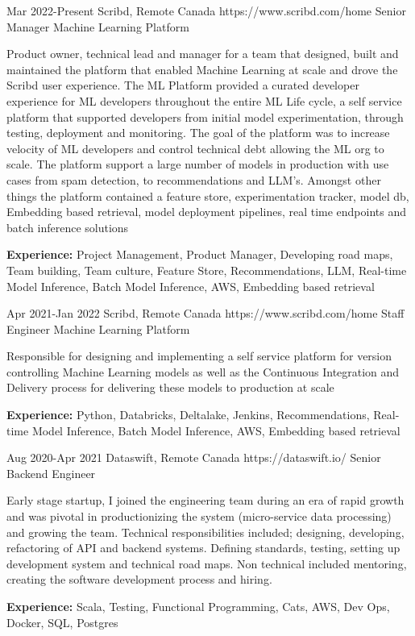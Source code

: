 \documentclass{article}
\begin{document}
\begin{job}
{Mar 2022-}{Present}
{Scribd, Remote Canada}
{https://www.scribd.com/home}
{Senior Manager Machine Learning Platform}%
{Product owner, technical lead and manager for a team that designed, built and maintained the platform that enabled Machine Learning at scale and drove the Scribd user experience. The ML Platform provided a curated developer experience for ML developers throughout the entire ML Life cycle, a self service platform that supported developers from initial model experimentation, through testing, deployment and monitoring. The goal of the platform was to increase velocity of ML developers and control technical debt allowing the ML org to scale. The platform support a large number of models in production with use cases from spam detection, to recommendations and LLM's. Amongst other things the platform contained a feature store, experimentation tracker, model db, Embedding based retrieval, model deployment pipelines, real time endpoints and batch inference solutions \\
\rule{0mm}{5mm}\textbf{Experience:} Project Management, Product Manager, Developing road maps, Team building, Team culture, Feature Store, Recommendations, LLM, Real-time Model Inference, Batch Model Inference, AWS, Embedding based retrieval }
\end{job}


\begin{job}
{Apr 2021-}{Jan 2022}
{Scribd, Remote Canada}
{https://www.scribd.com/home}
{Staff Engineer Machine Learning Platform}%
{Responsible for designing and implementing a self service platform for version controlling Machine Learning models as well as the Continuous Integration and Delivery process for delivering these models to production at scale \\
\rule{0mm}{5mm}\textbf{Experience:} Python, Databricks, Deltalake, Jenkins, Recommendations, Real-time Model Inference, Batch Model Inference, AWS, Embedding based retrieval }
\end{job}


\begin{job}
{Aug 2020-}{Apr 2021}
{Dataswift, Remote Canada}
{https://dataswift.io/}
{Senior Backend Engineer}%
{Early stage startup, I joined the engineering team during an era of rapid growth and was pivotal in productionizing the system (micro-service data processing) and growing the team. Technical responsibilities included; designing, developing, refactoring of API and backend systems. Defining standards, testing, setting up development system and technical road maps. Non technical included  mentoring, creating the software development process and hiring.  \\
\rule{0mm}{5mm}\textbf{Experience:} Scala, Testing, Functional Programming, Cats, AWS, Dev Ops, Docker, SQL, Postgres}
\end{job}
\end{document}

